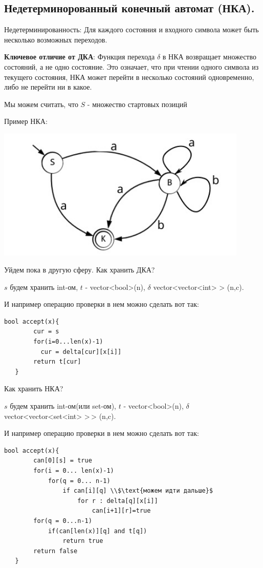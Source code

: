 \subsection{Недетерминорованный конечный автомат (НКА).}

Недетерминированность: Для каждого состояния и входного символа может быть несколько возможных переходов.

\textbf{Ключевое отличие от ДКА}: Функция перехода $\delta$ в НКА возвращает множество состояний, а не одно состояние. Это означает, что при чтении одного символа из текущего состояния, НКА может перейти в несколько состояний одновременно, либо не перейти ни в какое.

Мы можем считать, что $S$ - множество стартовых позиций

Пример НКА:
\begin{center}
    \includegraphics[width = 12cm]{assets/8_1_1.jpg}
\end{center}

Уйдем пока в другую сферу. Как хранить ДКА?

$s$ будем хранить int-ом, $t$ - vector<bool>(n), $\delta$ vector<vector<int> > (n,c). 

И например операцию проверки в нем можно сделать вот так:

\begin{lstlisting}[mathescape]
   bool accept(x){
        cur = s
        for(i=0...len(x)-1)
          cur = delta[cur][x[i]]
        return t[cur]
   }
\end{lstlisting}
Как хранить НКА?

$s$ будем хранить int-ом(или set-ом), $t$ - vector<bool>(n), $\delta$ vector<vector<set<int> >\,> (n,c). 

И например операцию проверки в нем можно сделать вот так:

\begin{lstlisting}[mathescape]
   bool accept(x){
        can[0][s] = true
        for(i = 0... len(x)-1)
            for(q = 0... n-1)
                if can[i][q] \\$\text{можем идти дальше}$
                    for r : delta[q][x[i]]
                        can[i+1][r]=true
        for(q = 0...n-1)
            if(can[len(x)][q] and t[q])
                return true
        return false
   }
\end{lstlisting}

